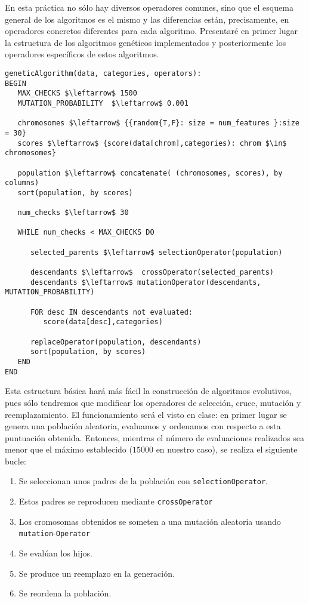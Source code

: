 \documentclass[11pt,leqno]{article}
\begin{document}
En esta práctica no sólo hay diversos operadores comunes, sino que el esquema general de los algoritmos es el mismo y las diferencias están, precisamente, en operadores concretos diferentes para cada algoritmo. Presentaré en primer lugar la estructura de los algoritmos genéticos implementados y posteriormente los operadores específicos de estos algoritmos.
	
\begin{lstlisting}[mathescape=true]
geneticAlgorithm(data, categories, operators):
BEGIN
   MAX_CHECKS $\leftarrow$ 1500
   MUTATION_PROBABILITY  $\leftarrow$ 0.001
   
   chromosomes $\leftarrow$ {{random{T,F}: size = num_features }:size = 30}
   scores $\leftarrow$ {score(data[chrom],categories): chrom $\in$ chromosomes} 
   
   population $\leftarrow$ concatenate( (chromosomes, scores), by columns)
   sort(population, by scores)
   
   num_checks $\leftarrow$ 30
   
   WHILE num_checks < MAX_CHECKS DO
   
      selected_parents $\leftarrow$ selectionOperator(population)
      
      descendants $\leftarrow$  crossOperator(selected_parents)
      descendants $\leftarrow$ mutationOperator(descendants, MUTATION_PROBABILITY)
                                                      
      FOR desc IN descendants not evaluated:
         score(data[desc],categories)
                            
      replaceOperator(population, descendants)
      sort(population, by scores)
   END
END
\end{lstlisting}	

	Esta estructura básica hará más fácil la construcción de algoritmos evolutivos, pues sólo tendremos que modificar los operadores de selección, cruce, mutación y reemplazamiento. El funcionamiento será el visto en clase: en primer lugar se genera una población aleatoria, evaluamos y ordenamos con respecto a esta puntuación obtenida. Entonces, mientras el número de evaluaciones realizados sea menor que el máximo establecido ($15000$ en nuestro caso), se realiza el siguiente bucle:
	
\begin{enumerate}[i]
\item Se seleccionan unos padres de la población con \texttt{selectionOperator}.
\item Estos padres se reproducen mediante \texttt{crossOperator}
\item Los cromosomas obtenidos se someten a una mutación aleatoria usando \texttt{mutation}-\texttt{Operator}
\item Se evalúan los hijos.
\item Se produce un reemplazo en la generación.
\item Se reordena la población.
\end{enumerate}
\end{document}
